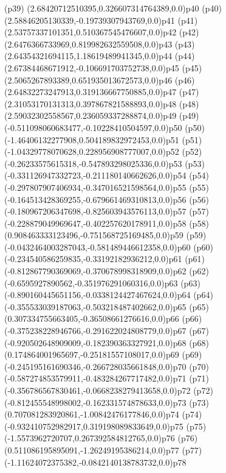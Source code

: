 \psdot(p39)
\psPoint(2.68420712510395,0.326607314764389,0.0){p40}
\psdot(p40)
\psPoint(2.58846205130339,-0.19739307943769,0.0){p41}
\psdot(p41)
\psPoint(2.53757337101351,0.510367545476607,0.0){p42}
\psdot(p42)
\psPoint(2.6476366733969,0.819982632559508,0.0){p43}
\psdot(p43)
\psPoint(2.64354321694115,1.18619489941345,0.0){p44}
\psdot(p44)
\psPoint(2.67384468671912,-0.106691703752738,0.0){p45}
\psdot(p45)
\psPoint(2.5065267893389,0.651935013672573,0.0){p46}
\psdot(p46)
\psPoint(2.64832273247913,0.319136667750885,0.0){p47}
\psdot(p47)
\psPoint(2.31053170131313,0.397867821588893,0.0){p48}
\psdot(p48)
\psPoint(2.59032302558567,0.236059337288874,0.0){p49}
\psdot(p49)
\psPoint(-0.511098060683477,-0.10228410504597,0.0){p50}
\psdot(p50)
\psPoint(-1.46406132277908,0.504189832972453,0.0){p51}
\psdot(p51)
\psPoint(-1.04329778070628,0.228956908777007,0.0){p52}
\psdot(p52)
\psPoint(-0.26233575615318,-0.547893298025336,0.0){p53}
\psdot(p53)
\psPoint(-0.331126947332723,-0.211180140662626,0.0){p54}
\psdot(p54)
\psPoint(-0.297807907406934,-0.347016521598564,0.0){p55}
\psdot(p55)
\psPoint(-0.164513428369255,-0.679661469310813,0.0){p56}
\psdot(p56)
\psPoint(-0.180967206347698,-0.825603943576113,0.0){p57}
\psdot(p57)
\psPoint(-0.228879049969647,-0.402257620178911,0.0){p58}
\psdot(p58)
\psPoint(0.908463333123496,-0.751568725169485,0.0){p59}
\psdot(p59)
\psPoint(-0.0432464003287043,-0.581489446612358,0.0){p60}
\psdot(p60)
\psPoint(-0.234540586259835,-0.33192182936212,0.0){p61}
\psdot(p61)
\psPoint(-0.812867790369069,-0.370678998318909,0.0){p62}
\psdot(p62)
\psPoint(-0.6595927890562,-0.351976291060316,0.0){p63}
\psdot(p63)
\psPoint(-0.890160445651156,-0.0338124427467624,0.0){p64}
\psdot(p64)
\psPoint(-0.355533039187063,-0.503218487402662,0.0){p65}
\psdot(p65)
\psPoint(0.307334755663405,-0.36508661276616,0.0){p66}
\psdot(p66)
\psPoint(-0.375238228946766,-0.291622024808779,0.0){p67}
\psdot(p67)
\psPoint(-0.920502648909009,-0.182390363327921,0.0){p68}
\psdot(p68)
\psPoint(0.174864001965697,-0.25181557108017,0.0){p69}
\psdot(p69)
\psPoint(-0.245195161690346,-0.266728035661848,0.0){p70}
\psdot(p70)
\psPoint(-0.587274853579911,-0.483284267717482,0.0){p71}
\psdot(p71)
\psPoint(-0.356786567830461,-0.0668238279413658,0.0){p72}
\psdot(p72)
\psPoint(-0.812455548998002,-0.162331574878633,0.0){p73}
\psdot(p73)
\psPoint(0.707081283920861,-1.00842476177846,0.0){p74}
\psdot(p74)
\psPoint(-0.932410752982917,0.319198089833649,0.0){p75}
\psdot(p75)
\psPoint(-1.5573962720707,0.267392584812765,0.0){p76}
\psdot(p76)
\psPoint(0.511086195895091,-1.26249195386214,0.0){p77}
\psdot(p77)
\psPoint(-1.11624072375382,-0.0842140138783732,0.0){p78}
